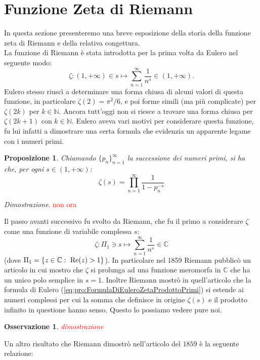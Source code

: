\documentclass[11pt]{book}
\makeatletter
\theoremstyle{Definizione}
\theoremstyle{TeoremaProposizioneLemmaCorollarioCongettura}
\newtheorem{mypropo}[myteo]{Proposizione}
\theoremstyle{OsservazioneNotaEsempio}
\newtheorem{myobs}{Osservazione}[section]
\renewenvironment{proof}[1][\proofname]{\par
  \normalfont \topsep6\p@\@plus6\p@\relax
  \trivlist
  \item[\hskip\labelsep
        \itshape
    #1\@addpunct{.}]\ignorespaces
}{%
  \endtrivlist\@endpefalse
}
\renewenvironment{proof}{\textsl{Dimostrazione}.}{}
\newcommand{\N}{\mathbb{N}}
\newcommand{\C}{\mathbb{C}}
\renewcommand{\Re}{\textup{Re}}
\makeatother
\begin{document}
\section{Funzione Zeta di Riemann}
In questa sezione presenteremo una breve esposizione della storia della funzione zeta di Riemann e della relativa congettura.\\
La funzione di Riemann è stata introdotta per la prima volta da Eulero nel seguente modo:
$$
\zeta:(1,+\infty)\in s \longmapsto \sum_{n = 1}^\infty \frac{1}{n^s}\in (1,+\infty).
$$
Eulero stesso riuscì a determinare una forma chiusa di alcuni valori di questa funzione, in particolare $\zeta(2) = \pi^2/6$, e poi forme simili (ma più complicate) per $\zeta(2k)$ per $k \in \N$. Ancora tutt'oggi non si riesce a trovare una forma chiusa per $\zeta(2k+1)$ con $k\in \N$. Eulero aveva vari motivi per considerare questa funzione, fu lui infatti a dimostrare una certa formula che evidenzia un apparente legame con i numeri primi. 
\begin{boxpro}
\begin{mypropo}
Chiamando $\{p_n\}_{n = 1}^\infty$ la successione dei numeri primi, si ha che, per ogni $s\in (1,+\infty)$:
\begin{equation}\label{eq:pro:FormulaDiEuleroZetaProdottoPrimi}
\zeta(s) = \prod_{n = 1}^\infty \frac{1}{1-p_n^{-s}}
\end{equation}
\end{mypropo}
\tcblower
\begin{proof}
\textcolor{red}{non ora}
\end{proof}
\end{boxpro}
\noindent
Il passo avanti successivo fu svolto da Riemann, che fu il primo a considerare $\zeta$ come una funzione di variabile complessa $s$:
$$
\zeta:\Pi_1 \ni s \longmapsto \sum_{n = 1}^\infty \frac{1}{n^s}\in \C
$$
(dove $\Pi_1 = \{z\in \C:\ \Re(z) > 1\}$). In particolare nel 1859 Riemann pubblicò un articolo in cui mostro che $\zeta$ si prolunga ad una funzione meromorfa in $\C$ che ha un unico polo semplice in $s = 1$. Inoltre Riemann mostrò in quell'articolo che la formula di Eulero (\ref{eq:pro:FormulaDiEuleroZetaProdottoPrimi}) si estende ai numeri complessi per cui la somma che definisce in origine $\zeta(s)$ e il prodotto infinito in questione hanno senso. Questo lo possiamo vedere pure noi.
\begin{myobs}
\textcolor{red}{dimostrazione}
\end{myobs}
Un altro risultato che Riemann dimostrò nell'articolo del $1859$ è la seguente relazione:
\end{document}
